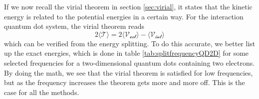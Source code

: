 If we now recall the virial theorem in section \ref{sec:virial}, it states that the kinetic energy is related to the potential energies in a certain way. For the interaction quantum dot system, the virial theorem reads
\begin{equation}
2\langle \mathcal{T} \rangle=2\langle \mathcal{V_{\text{ext}}} \rangle-\langle \mathcal{V_{\text{int}}} \rangle
\end{equation}
which can be verified from the energy splitting. To do this accurate, we better list up the exact energies, which is done in table \eqref{tab:splitfrequencyQD2D} for some selected frequencies for a two-dimensional quantum dots containing two electrons. By doing the math, we see that the virial theorem is satisfied for low frequencies, but as the frequency increases the theorem gets more and more off. This is the case for all the methods.

